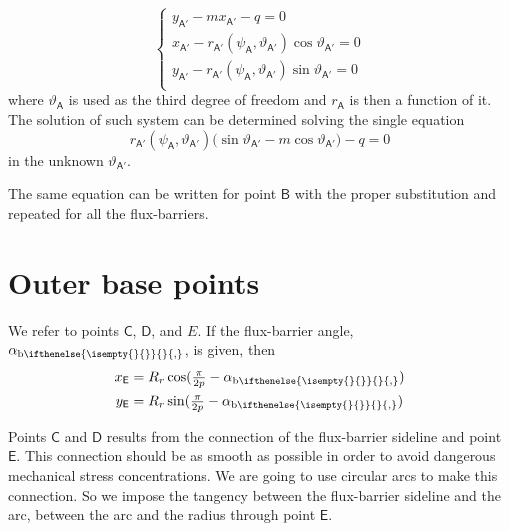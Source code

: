 \documentclass[b5paper,11pt,oneside,fleqn]{article}
\newcommand{\pt}[1]{\mathsf{#1}}
\newcommand{\te}{\vartheta}
\newcommand{\ab}[1][]{%
\alpha_{\textup{b}
\ifthenelse{\isempty{#1}{}}{}{,#1}%
}}
\newcommand{\pih}[1][]{\tfrac{\pi}{2#1}}
\begin{document}
\begin{equation}
\begin{cases}
y_\pt{A'} - m x_\pt{A'} - q = 0 \\
x_\pt{A'} - r_\pt{A'}(\psi_\pt{A},\te_\pt{A'}) \cos\te_\pt{A'} = 0 \\
y_\pt{A'} - r_\pt{A'}(\psi_\pt{A},\te_\pt{A'}) \sin\te_\pt{A'} = 0 \\
\end{cases}
\end{equation}
where $ \te_\pt{A} $ is used as the third degree of freedom and $ r_\pt{A} $ is 
then a function of it.
The solution of such system can be determined solving the single equation
\begin{equation}
r_\pt{A'}(\psi_\pt{A},\te_\pt{A'})
\bigl( \sin\te_\pt{A'} - m \cos\te_\pt{A'} \bigr) - q = 0
\end{equation}
in the unknown $ \te_\pt{A'} $.

The same equation can be written for point $ \pt{B} $ with the proper 
substitution and repeated for all the flux-barriers.



\section{Outer base points}
We refer to points $ \pt{C} $, $ \pt{D} $, and $ E $.
If the flux-barrier angle, $ \ab $, is given, then
\begin{equation}
\begin{aligned}
x_\pt{E} &= R_r \cos(\pih[p] - \ab) \\
y_\pt{E} &= R_r \sin(\pih[p] - \ab)
\end{aligned}
\end{equation}

Points $ \pt{C} $ and $ \pt{D} $ results from the connection of the 
flux-barrier sideline and point $ \pt{E} $.
This connection should be as smooth as possible in order to 
avoid dangerous mechanical stress concentrations.
We are going to use circular arcs to make this connection.
So we impose the tangency between the flux-barrier sideline and the arc, 
between the arc and the radius through point $ \pt{E} $.
\end{document}
